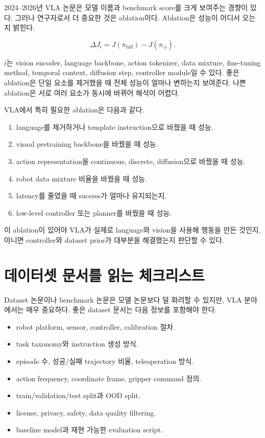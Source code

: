 2024--2026년 VLA 논문은 모델 이름과 benchmark score를 크게 보여주는 경향이 있다. 그러나 연구자로서 더 중요한 것은 ablation이다. Ablation은 성능이 어디서 오는지 밝힌다.

\begin{equation}
  \Delta J_i
  =
  J(\pi_{\mathrm{full}})
  -
  J(\pi_{\setminus i}).
\end{equation}

$i$는 vision encoder, language backbone, action tokenizer, data mixture, fine-tuning method, temporal context, diffusion step, controller module일 수 있다. 좋은 ablation은 단일 요소를 제거했을 때 전체 성능이 얼마나 변하는지 보여준다. 나쁜 ablation은 서로 여러 요소가 동시에 바뀌어 해석이 어렵다.

VLA에서 특히 필요한 ablation은 다음과 같다.

\begin{enumerate}
  \item language를 제거하거나 template instruction으로 바꿨을 때 성능.
  \item visual pretraining backbone을 바꿨을 때 성능.
  \item action representation을 continuous, discrete, diffusion으로 바꿨을 때 성능.
  \item robot data mixture 비율을 바꿨을 때 성능.
  \item latency를 줄였을 때 success가 얼마나 유지되는지.
  \item low-level controller 또는 planner를 바꿨을 때 성능.
\end{enumerate}

이 ablation이 있어야 VLA가 실제로 language와 vision을 사용해 행동을 만든 것인지, 아니면 controller와 dataset prior가 대부분을 해결했는지 판단할 수 있다.

\section{데이터셋 문서를 읽는 체크리스트}

Dataset 논문이나 benchmark 논문은 모델 논문보다 덜 화려할 수 있지만, VLA 분야에서는 매우 중요하다. 좋은 dataset 문서는 다음 정보를 포함해야 한다.

\begin{itemize}
  \item robot platform, sensor, controller, calibration 절차.
  \item task taxonomy와 instruction 생성 방식.
  \item episode 수, 성공/실패 trajectory 비율, teleoperation 방식.
  \item action frequency, coordinate frame, gripper command 정의.
  \item train/validation/test split과 OOD split.
  \item license, privacy, safety, data quality filtering.
  \item baseline model과 재현 가능한 evaluation script.
\end{itemize}

